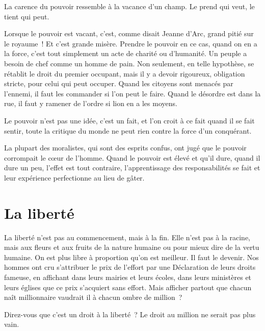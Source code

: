 \documentclass[french,twoside]{book} %
\newcommand{\astermono}{\medskip\centerline{\color{rubric}\large\selectfont{\syms ✻}}\medskip\par}%
\begin{document}
\astermono

\noindent La carence du pouvoir ressemble à la vacance d’un champ. Le prend qui veut, le tient qui peut.\par

\astermono

\noindent Lorsque le pouvoir est vacant, c’est, comme disait Jeanne d’Arc, grand pitié sur le royaume ! Et c’est grande misère. Prendre le pouvoir en ce cas, quand on en a la force, c’est tout simplement un acte de charité ou d’humanité. Un peuple a besoin de chef comme un homme de pain. Non seulement, en telle hypothèse, se rétablit le droit du premier occupant, mais il y a devoir rigoureux, obligation stricte, pour celui qui peut occuper. Quand les citoyens sont menacés par l’ennemi, il faut les commander si l’on peut le faire. Quand le désordre est dans la rue, il faut y ramener de l’ordre si lion en a les moyens.\par

\astermono

\noindent Le pouvoir n’est pas une idée, c’est un fait, et l’on croit à ce fait quand il se fait sentir, toute la critique du monde ne peut rien contre la force d’un conquérant.\par

\astermono

\noindent La plupart des moralistes, qui sont des esprits confus, ont jugé que le pouvoir corrompait le cœur de l’homme. Quand le pouvoir est élevé et qu’il dure, quand il dure un peu, l’effet est tout contraire, l’apprentissage des responsabilités se fait et leur expérience perfectionne au lieu de gâter.
\section[{La liberté}]{La liberté}
\noindent La liberté n’est pas au commencement, mais à la fin. Elle n’est pas à la racine, mais aux fleurs et aux fruits de la nature humaine ou pour mieux dire de la vertu humaine. On est plus libre à proportion qu’on est meilleur. Il faut le devenir. Nos hommes ont cru s’attribuer le prix de l’effort par une Déclaration de leurs droits fameuse, en affichant dans leurs mairies et leurs écoles, dans leurs ministères et leurs églises que ce prix s’acquiert sans effort. Mais afficher partout que chacun naît millionnaire vaudrait il à chacun ombre de million ?\par
Direz-vous que c’est un droit à la liberté ? Le droit au million ne serait pas plus vain.\par
\end{document}
